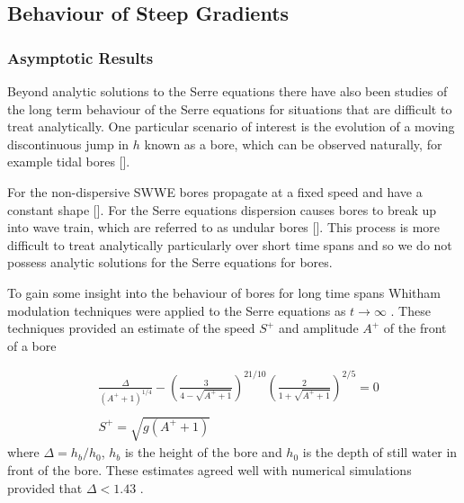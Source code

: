 \subsection{Behaviour of Steep Gradients}



\subsubsection{Asymptotic Results}
Beyond analytic solutions to the Serre equations there have also been studies of the long term behaviour of the Serre equations for situations that are difficult to treat analytically. One particular scenario of interest is the evolution of a moving discontinuous jump in $h$ known as a bore, which can be observed naturally, for example tidal bores [].

For the non-dispersive SWWE bores propagate at a fixed speed and have a constant shape []. For the Serre equations dispersion causes bores to break up into wave train, which are referred to as undular bores []. This process is more difficult to treat analytically particularly over short time spans and so we do not possess analytic solutions for the Serre equations for bores.

To gain some insight into the behaviour of bores for long time spans Whitham modulation techniques were applied to the Serre equations as $t \rightarrow \infty$ \cite{El-etal-2006}. These techniques provided an estimate of the speed $S^+$ and amplitude $A^+$ of the front of a bore

\begin{subequations}
	\begin{align}
	&\frac{\Delta}{\left(A^+ + 1\right)^{1/4}} - \left(\frac{3}{4 -  \sqrt{A^+ + 1}}\right)^{21/10} \left(\frac{2}{1 + \sqrt{A^+ + 1}}\right)^{2/5} = 0	\label{eqn:Aplusdef} \\  \nonumber \\
	&S^+ = \sqrt{g \left(A^+ + 1\right)}	\label{eqn:Splusdef}
	\end{align}
	\label{eqn:ELWhitMod}	
\end{subequations}
where $\Delta = h_b / h_0$, $h_b$ is the height of the bore and $h_0$ is the depth of still water in front of the bore. These estimates agreed well with numerical simulations provided that $\Delta < 1.43$ \cite{El-etal-2006}.